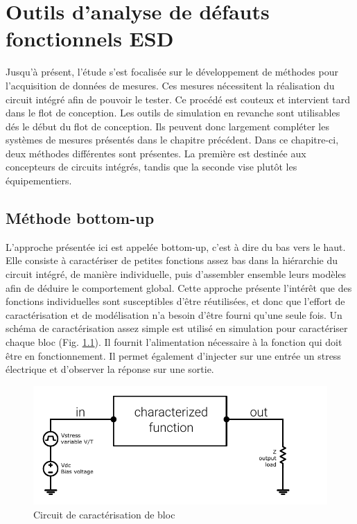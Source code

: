 \chapter{Outils d'analyse de défauts fonctionnels ESD}
\label{chap:4}

Jusqu'à présent, l'étude s'est focalisée sur le développement de méthodes pour l'acquisition de données de mesures.
Ces mesures nécessitent la réalisation du circuit intégré afin de pouvoir le tester.
Ce procédé est couteux et intervient tard dans le flot de conception.
Les outils de simulation en revanche sont utilisables dés le début du flot de conception.
Ils peuvent donc largement compléter les systèmes de mesures présentés dans le chapitre précédent.
Dans ce chapitre-ci, deux méthodes différentes sont présentes.
La première est destinée aux concepteurs de circuits intégrés, tandis que la seconde vise plutôt les équipementiers.

\section{Méthode bottom-up}

L'approche présentée ici est appelée bottom-up, c'est à dire du bas vers le haut.
Elle consiste à caractériser de petites fonctions assez bas dans la hiérarchie du circuit intégré, de manière individuelle, puis d'assembler ensemble leurs modèles afin de déduire le comportement global.
Cette approche présente l'intérêt que des fonctions individuelles sont susceptibles d'être réutilisées, et donc que l'effort de caractérisation et de modélisation n'a besoin d'être fourni qu'une seule fois.
Un schéma de caractérisation assez simple est utilisé en simulation pour caractériser chaque bloc (Fig. \ref{block_function_cz}).
Il fournit l'alimentation nécessaire à la fonction qui doit être en fonctionnement.
Il permet également d'injecter sur une entrée un stress électrique et d'observer la réponse sur une sortie.

\begin{figure}[!h]
  \centering
  \includegraphics{src/1/figures/characterization_setup.pdf}
  \caption{Circuit de caractérisation de bloc}
  \label{block_function_cz}
\end{figure}

